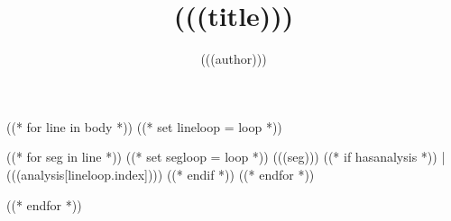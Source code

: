 \documentclass{tufte-handout}
\title{(((title)))}
\author{(((author)))}
\begin{document}
\maketitle

((* for line in body *))
    ((* set lineloop = loop *))
	\begin{(((language)))}
	((* for seg in line *))
	    ((* set segloop = loop *))
		(((seg))) ((* if hasanalysis *)) | (((analysis[lineloop.index]))) ((* endif *))
    ((* endfor *))
	\end{(((language)))}
((* endfor *))
\end{document}
